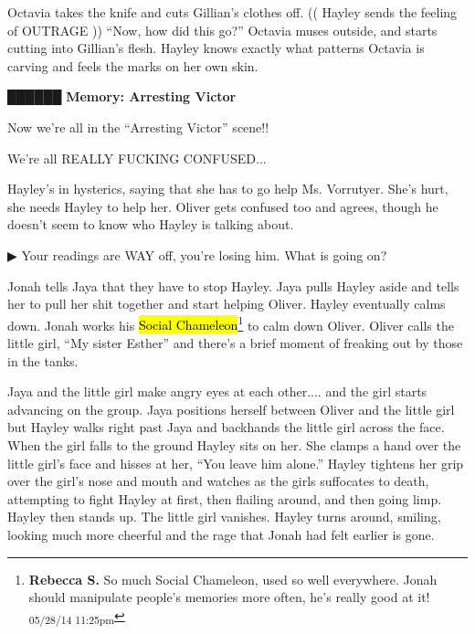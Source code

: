 Octavia takes the knife and cuts Gillian's clothes off.  (( Hayley sends the feeling of OUTRAGE )) ``Now, how did this go?''  Octavia muses outside, and starts cutting into Gillian's flesh.  Hayley knows exactly what patterns Octavia is carving and feels the marks on her own skin.



 {\LARGE \textbf{ {\color[RGB]{51,51,51}██████} } }  {\LARGE \textbf{ Memory: Arresting Victor} } 

Now we're all in the ``Arresting Victor'' scene!!



We're all REALLY FUCKING CONFUSED... 



Hayley's in hysterics, saying that she has to go help Ms. Vorrutyer.  She's hurt, she needs Hayley to help her.  Oliver gets confused too and agrees, though he doesn't seem to know who Hayley is talking about.



 {\color[RGB]{68,68,68}▶ } Your readings are WAY off, you're losing him.  What is going on?



Jonah tells Jaya that they have to stop Hayley.  Jaya pulls Hayley aside and tells her to pull her shit together and start helping Oliver.  Hayley eventually calms down.  Jonah works his \hl{Social Chameleon}\footnote{\textbf{Rebecca S. }So much Social Chameleon, used so well everywhere.  Jonah should manipulate people's memories more often, he's really good at it! \textsubscript{05/28/14 11:25pm}} to calm down Oliver.  Oliver calls the little girl, ``My sister Esther'' and there's a brief moment of freaking out by those in the tanks. 



Jaya and the little girl make angry eyes at each other.... and the girl starts advancing on the group.  Jaya positions herself between Oliver and the little girl but Hayley walks right past Jaya and backhands the little girl across the face.  When the girl falls to the ground Hayley sits on her.  She clamps a hand over the little girl's face and hisses at her, ``You leave him alone.''  Hayley tightens her grip over the girl's nose and mouth and watches as the girls suffocates to death, attempting to fight Hayley at first, then flailing around, and then going limp.  Hayley then stands up.  The little girl vanishes. Hayley turns around, smiling, looking much more cheerful and the rage that Jonah had felt earlier is gone.



